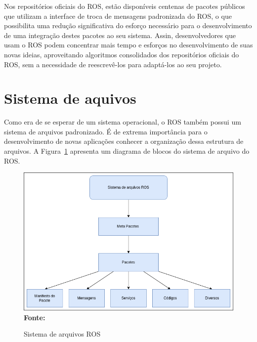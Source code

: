 Nos repositórios oficiais do ROS, estão disponíveis centenas de pacotes públicos que utilizam a interface de troca de mensagens padronizada do ROS, o que possibilita uma redução significativa do esforço necessário para o desenvolvimento de uma integração destes pacotes ao seu sistema. Assin, desenvolvedores que usam o ROS podem concentrar mais tempo e esforços no desenvolvimento de suas novas ideias, aproveitando algoritmos consolidados dos repositórios oficiais do ROS, sem a necessidade de reescrevê-los para adaptá-los ao seu projeto.


\section{Sistema de aquivos}
Como era de se esperar de um sistema operacional, o ROS também possui um sistema de arquivos padronizado. É de extrema importância para o desenvolvimento de novas aplicações conhecer a organização dessa estrutura de arquivos. A Figura~\ref{fig:rosfile} apresenta um diagrama de blocos do sistema de arquivo do ROS\@.

\begin{figure}[ht]
	\caption{Sistema de arquivos ROS}
	\begin{center}
		\includegraphics[scale=0.45]{imagens/fileSiystem.png}\\
		{\small \textbf{Fonte:} }
    \end{center}\label{fig:rosfile}
\end{figure}

